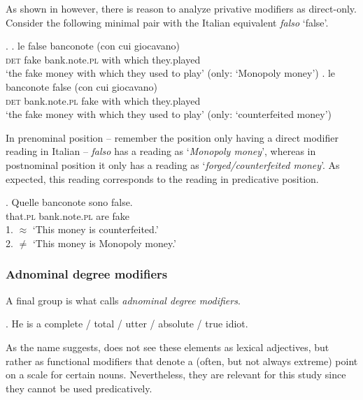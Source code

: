 As shown in \citet[21–23]{cinque:2014:semantics} however, there is reason to analyze privative modifiers as direct-only. Consider the following minimal pair with the  Italian equivalent \textit{falso} `false’.

\ex. \ag. le false banconote (con cui giocavano)\\
\textsc{det} fake bank.note.\textsc{pl} with which they.played\\
`the fake money with which they used to play’ (only: `Monopoly money’)
 \bg. le banconote false (con cui giocavano)\\
\textsc{det} bank.note.\textsc{pl} fake with which they.played\\
`the fake money with which they used to play’ (only: `counterfeited money’) \hfill \citep[21]{cinque:2014:semantics}

In prenominal position -- remember the position only having a direct modifier reading in Italian -- \textit{falso} has a reading as `\textit{Monopoly money}’, whereas in postnominal position it only has a reading as `\textit{forged/counterfeited money}’. As expected, this reading corresponds to the reading in predicative position.

\exg. Quelle banconote sono false.\\
that.\textsc{pl} bank.note.\textsc{pl} are fake\\
1. $\approx$ `This money is counterfeited.’\\
2. $\neq$ `This money is Monopoly money.’ \null\hfill \citep[21]{cinque:2014:semantics}

\subsubsection{Adnominal degree modifiers}

A final group is what \citet{morzycki:2016:mod} calls \textit{adnominal degree modifiers}.

\ex. He is a complete / total / utter / absolute / true idiot. \\ \null\hfill \citep[56–57]{morzycki:2016:mod}

As the name suggests, \citet{morzycki:2014:where, morzycki:2016:mod} does not see these elements as lexical adjectives, but rather as functional modifiers that denote a (often, but not always extreme) point on a scale for certain nouns. Nevertheless, they are relevant for this study since they cannot be used predicatively.

